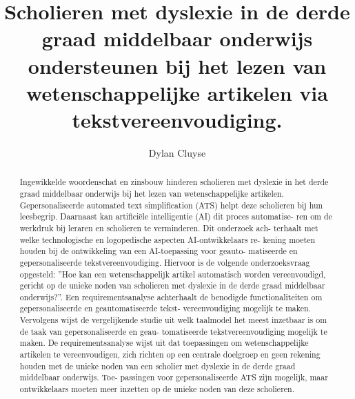 \documentclass{hogent-article}
\title{Scholieren met dyslexie in de derde graad middelbaar onderwijs ondersteunen bij het lezen van wetenschappelijke artikelen via tekstvereenvoudiging.}
\author{Dylan Cluyse}
\begin{document}
	
\begin{abstract}
Ingewikkelde woordenschat en zinsbouw hinderen scholieren met dyslexie in het derde graad middelbaar onderwijs bij het lezen van wetenschappelijke artikelen. Gepersonaliseerde automated text simplification (ATS) helpt deze scholieren bij hun leesbegrip. Daarnaast kan artificiële intelligentie (AI) dit proces automatise- ren om de werkdruk bij leraren en scholieren te verminderen. Dit onderzoek ach- terhaalt met welke technologische en logopedische aspecten AI-ontwikkelaars re- kening moeten houden bij de ontwikkeling van een AI-toepassing voor geauto- matiseerde en gepersonaliseerde tekstvereenvoudiging. Hiervoor is de volgende onderzoeksvraag opgesteld: ”Hoe kan een wetenschappelijk artikel automatisch worden vereenvoudigd, gericht op de unieke noden van scholieren met dyslexie in de derde graad middelbaar onderwijs?”. Een requirementsanalyse achterhaalt de benodigde functionaliteiten om gepersonaliseerde en geautomatiseerde tekst- vereenvoudiging mogelijk te maken. Vervolgens wijst de vergelijkende studie uit welk taalmodel het meest inzetbaar is om de taak van gepersonaliseerde en geau- tomatiseerde tekstvereenvoudiging mogelijk te maken. De requirementsanalyse wijst uit dat toepassingen om wetenschappelijke artikelen te vereenvoudigen, zich richten op een centrale doelgroep en geen rekening houden met de unieke noden van een scholier met dyslexie in de derde graad middelbaar onderwijs. Toe- passingen voor gepersonaliseerde ATS zijn mogelijk, maar ontwikkelaars moeten meer inzetten op de unieke noden van deze scholieren. 
\end{abstract}


\tableofcontents



\printbibliography[heading=bibintoc]
\end{document}
